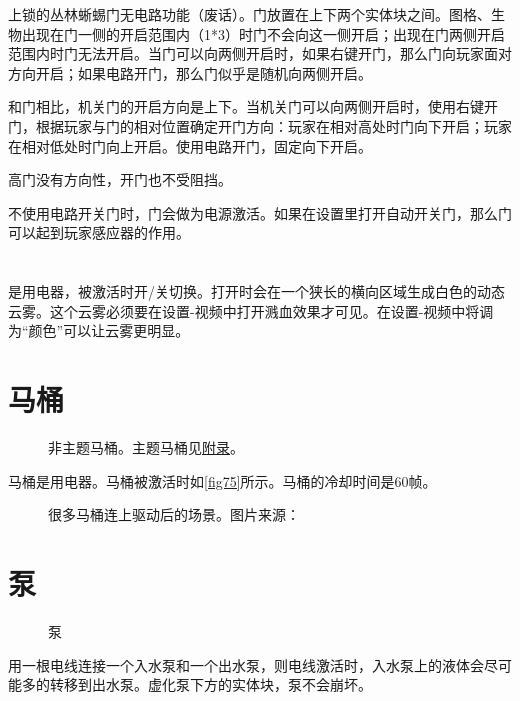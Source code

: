 上锁的丛林蜥蜴门无电路功能（废话）。门放置在上下两个实体块之间。图格、生物出现在门一侧的开启范围内（1*3）时门不会向这一侧开启；出现在门两侧开启范围内时门无法开启。当门可以向两侧开启时，如果右键开门，那么门向玩家面对方向开启；如果电路开门，那么门似乎是随机向两侧开启。

和门相比，机关门的开启方向是上下。当机关门可以向两侧开启时，使用右键开门，根据玩家与门的相对位置确定开门方向：玩家在相对高处时门向下开启；玩家在相对低处时门向上开启。使用电路开门，固定向下开启。

高门没有方向性，开门也不受阻挡。

不使用电路开关门时，门会做为电源激活。如果在设置里打开自动开关门，那么门可以起到玩家感应器的作用。

\section{\FM}
\begin{figure}[!ht]
\centering
{}
\caption{\FM}
\end{figure}
\FM 是用电器，被激活时开/关切换。\FM 打开时会在一个狭长的横向区域生成白色的动态云雾。这个云雾必须要在设置-视频中打开溅血效果才可见。在设置-视频中将调为“颜色”可以让云雾更明显。

\section{马桶}
\begin{figure}[!ht]
\centering
{}\quad{}
\caption{非主题马桶。主题马桶见\hyperref[app44]{附录}。}
\end{figure}
马桶是用电器。马桶被激活时如\autoref{fig75}所示。马桶的冷却时间是60帧。
\begin{figure}[!ht]
\centering
{}
\caption{很多马桶连上驱动后的场景。图片来源：\protect{}}\label{fig75}
\end{figure}

\section{泵}
\begin{figure}[!ht]
\centering
{}\qquad
{}
\caption{泵}
\end{figure}
用一根电线连接一个入水泵和一个出水泵，则电线激活时，入水泵上的液体会尽可能多的转移到出水泵。虚化泵下方的实体块，泵不会崩坏。


